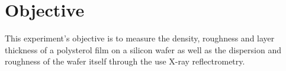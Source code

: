 \section{Objective}
\label{sec:versuchsziel}

This experiment's objective is to measure the density, roughness and layer thickness of a polysterol film on a silicon wafer as well as
the dispersion and roughness of the wafer itself through the use X-ray reflectrometry. 


